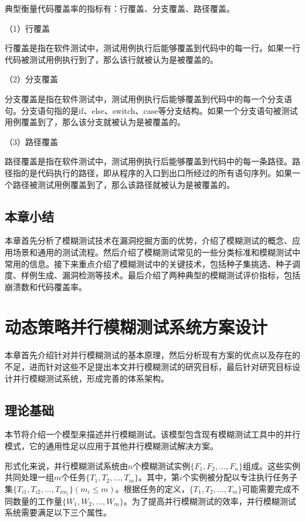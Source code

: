 \documentclass[master]{thesis-uestc}
\begin{document}
典型衡量代码覆盖率的指标有：行覆盖、分支覆盖、路径覆盖。

（1）行覆盖

行覆盖是指在软件测试中，测试用例执行后能够覆盖到代码中的每一行。如果一行代码被测试用例执行到了，那么该行就被认为是被覆盖的。

（2）分支覆盖

分支覆盖是指在软件测试中，测试用例执行后能够覆盖到代码中的每一个分支语句。分支语句指的是if、else、switch、case等分支结构。如果一个分支语句被测试用例覆盖到了，那么该分支就被认为是被覆盖的。

（3）路径覆盖

路径覆盖是指在软件测试中，测试用例执行后能够覆盖到代码中的每一条路径。路径指的是代码执行的路径，即从程序的入口到出口所经过的所有语句序列。如果一个路径被测试用例覆盖到了，那么该路径就被认为是被覆盖的。

\section{本章小结}

本章首先分析了模糊测试技术在漏洞挖掘方面的优势，介绍了模糊测试的概念、应用场景和通用的测试流程。然后介绍了模糊测试常见的一些分类标准和模糊测试中常用的信息。接下来重点介绍了模糊测试中的关键技术，包括种子集挑选、种子调度、样例生成、漏洞检测等技术。最后介绍了两种典型的模糊测试评价指标，包括崩溃数和代码覆盖率。

\chapter{动态策略并行模糊测试系统方案设计}

本章首先介绍针对并行模糊测试的基本原理，然后分析现有方案的优点以及存在的不足，进而针对这些不足提出本文并行模糊测试的研究目标，最后针对研究目标设计并行模糊测试系统，形成完善的体系架构。

\section{理论基础}
本节将介绍一个模型来描述并行模糊测试。该模型包含现有模糊测试工具中的并行模式，它的通用性足以应用于其他并行模糊测试解决方案。

形式化来说，并行模糊测试系统由$n$个模糊测试实例$\{F_1, F_2, ..., F_n \}$组成。这些实例共同处理一组$m$个任务$\{T_1, T_2, ..., T_m \}$。其中，第$i$个实例被分配以专注执行任务子集$\{T_{i1}, T_{i2}, ..., T_{im_i}\}(m_i \leq m)$。根据任务的定义，$\{T_1, T_2, ..., T_m \}$可能需要完成不同数量的工作量$\{W_1, W_2, ..., W_m \}$。为了提高并行模糊测试的效率，并行模糊测试系统需要满足以下三个属性。
\end{document}
